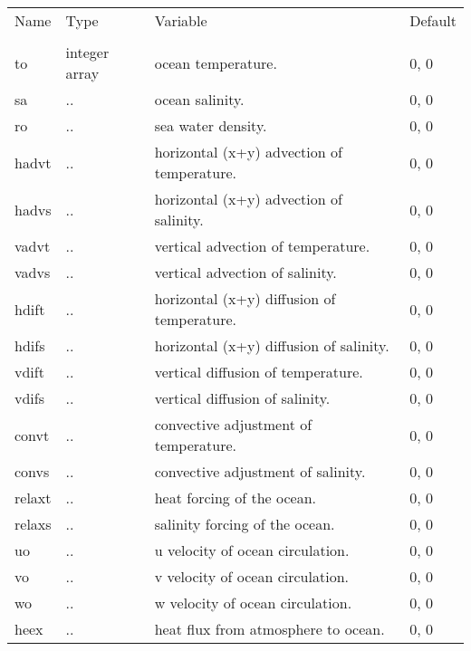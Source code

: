 \begin{tabular}{llll}
Name	&    Type          &	Variable			        &	Default    \\
\\
\hline
to	&    integer array  &	ocean temperature.		                &	0, 0 \\
sa      &    ..            &    ocean salinity.		                        &	0, 0  \\
ro      &    ..            &    sea water density.       	                &	0, 0  \\
hadvt   &    ..            &    horizontal (x+y) advection of temperature.	&       0, 0  \\
hadvs   &    ..            &    horizontal (x+y) advection of salinity.    	&       0, 0  \\
vadvt   &    ..            &    vertical advection of temperature.	        &       0, 0  \\
vadvs   &    ..            &    vertical advection of salinity.               	&       0, 0  \\
hdift   &    ..            &    horizontal (x+y) diffusion of temperature.	&       0, 0  \\
hdifs   &    ..            &    horizontal (x+y) diffusion of salinity.  	&       0, 0  \\
vdift   &    ..            &    vertical diffusion of temperature.	        &       0, 0  \\
vdifs   &    ..            &    vertical diffusion of salinity.                 &       0, 0  \\
convt   &    ..            &    convective adjustment of temperature.  	        &       0, 0  \\
convs   &    ..            &    convective adjustment of salinity.	        &       0, 0  \\
relaxt  &    ..            &    heat forcing of the ocean.                      &       0, 0  \\
relaxs  &    ..            &    salinity forcing of the ocean.                  &       0, 0  \\
uo	&    ..	           &    u velocity of ocean circulation.                &	0, 0  \\
vo	&    ..            &    v velocity of ocean circulation.                &	0, 0  \\
wo	&    ..	           &    w velocity of ocean circulation.                &	0, 0  \\
heex    &    ..            &    heat flux from atmosphere to ocean.             &       0, 0  \\

\end{tabular}
